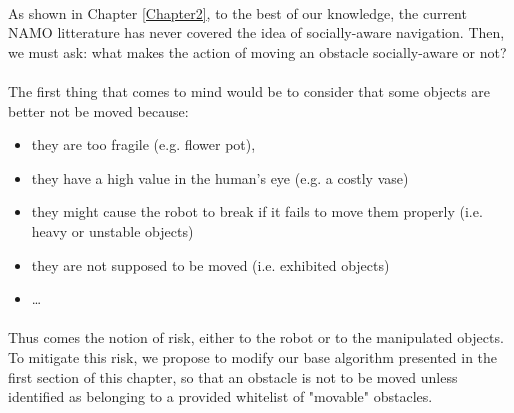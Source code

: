 \paragraph{} As shown in Chapter \ref{Chapter2}, to the best of our knowledge, the current NAMO litterature has never covered the idea of socially-aware navigation. Then, we must ask: what makes the action of moving an obstacle socially-aware or not?

\paragraph{} The first thing that comes to mind would be to consider that some objects are better not be moved because:

\begin{itemize}
  \item they are too fragile (e.g. flower pot),
  \item they have a high value in the human’s eye (e.g. a costly vase)
  \item they might cause the robot to break if it fails to move them properly (i.e. heavy or unstable objects)
  \item they are not supposed to be moved (i.e. exhibited objects)
  \item \dots
\end{itemize}

\paragraph{} Thus comes the notion of risk, either to the robot or to the manipulated objects. To mitigate this risk, we propose to modify our base algorithm presented in the first section of this chapter, so that an obstacle is not to be moved unless identified as belonging to a provided whitelist of "movable" obstacles.


